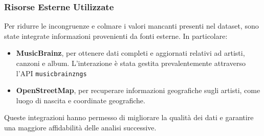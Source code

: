 \subsubsection*{Risorse Esterne Utilizzate}

Per ridurre le incongruenze e colmare i valori mancanti presenti nel
dataset, sono state integrate informazioni provenienti da fonti esterne.
In particolare:
\begin{itemize}
    \item \textbf{MusicBrainz}, per ottenere dati completi e aggiornati
    relativi ad artisti, canzoni e album. L'interazione è stata
    gestita prevalentemente attraverso l'API \texttt{musicbrainzngs}
    \item \textbf{OpenStreetMap}, per recuperare informazioni geografiche
    sugli artisti, come luogo di nascita e coordinate geografiche.
\end{itemize}
Queste integrazioni hanno permesso di migliorare la qualità dei dati e
garantire una maggiore affidabilità delle analisi successive.
